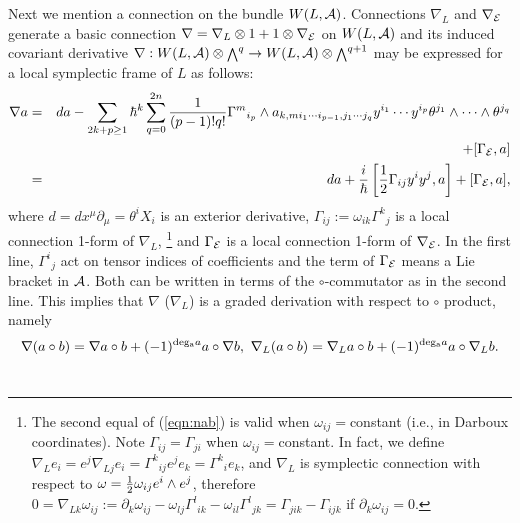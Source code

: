 \documentclass[10pt,a4paper]{article}
\def\h{\hbar}
\begin{document}
Next we mention a connection on the bundle $W(L,{\cal A})$. Connections $\nabla_L$ and $\nabla_{\cal E}$ generate a basic connection $\nabla=\nabla_L\otimes 1+1\otimes \nabla_{\cal E}$ on $W(L,{\cal A})$ and its induced covariant derivative $\nabla:W(L,{\cal A})\otimes{\scriptstyle \bigwedge}^q\rightarrow W(L,{\cal A})\otimes{\scriptstyle \bigwedge}^{q+1}$ may be expressed for a local symplectic frame of $L$ as follows:
\begin{eqnarray}
\label{eqn:nab}
\nabla a&=&da-\sum_{2k+p\geq1}\h^k\sum_{q=0}^{2n}{1\over(p-1)!q!}{\Gamma^m}_{i_p}\wedge a_{k,mi_1\cdots i_{p-1},j_1\cdots j_q}y^{i_1}\cdots y^{i_p}\theta^{j_1}\wedge\cdots\wedge\theta^{j_q}\nonumber\\
&&+[\Gamma_{\cal E},a]\nonumber\\
&=&da+{i\over\h}\left[{1\over2}\Gamma_{ij}y^iy^j,a\right]+[\Gamma_{\cal E},a],
\end{eqnarray}
where $d=dx^\mu\partial_\mu=\theta^iX_i$ is an exterior derivative, $\Gamma_{ij}:=\omega_{ik}{\Gamma^k}_j$ is a local connection 1-form of $\nabla_L$, 
\footnote{
         The second equal of (\ref{eqn:nab}) is valid when $\omega_{ij}=$constant (i.e., in Darboux coordinates). 
         Note $\Gamma_{ij}=\Gamma_{ji}$ when $\omega_{ij}=$constant.
         In fact, we define $\nabla_Le_i=e^j\nabla_{Lj}e_i={\Gamma^k}_{ij}e^je_k={\Gamma^k}_ie_k$, and $\nabla_L$ is symplectic connection with respect to $\omega={1\over2}\omega_{ij}e^i\wedge e^j$, therefore $0=\nabla_{Lk}\omega_{ij}:=\partial_k\omega_{ij}-\omega_{lj}{\Gamma^l}_{ik}-\omega_{il}{\Gamma^l}_{jk}=\Gamma_{jik}-\Gamma_{ijk}$ if $\partial_k\omega_{ij}=0$.
}
and $\Gamma_{\cal E}$ is a local connection 1-form of $\nabla_{\cal E}$. In the first line, ${\Gamma^i}_j$ act on tensor indices of coefficients and the term of $\Gamma_{\cal E}$ means a Lie bracket in ${\cal A}$. Both can be written in terms of the $\circ$-commutator as in the second line. This implies that $\nabla$ ($\nabla_L$) is a graded derivation with respect to $\circ$ product, namely
\begin{equation}
\nabla(a\circ b)=\nabla a\circ b+(-1)^{{\rm deg_a}a}a\circ \nabla b,\ \nabla_L(a\circ b)=\nabla_La\circ b+(-1)^{{\rm deg_a}a}a\circ \nabla_Lb.\nonumber
\end{equation}\\
\end{document}
